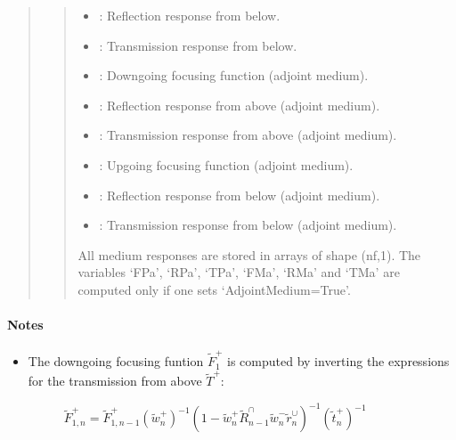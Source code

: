 \documentclass[letterpaper,10pt,english]{sphinxmanual}
\begin{document}
\begin{fulllineitems}
\begin{fulllineitems}
\begin{quote}
\begin{description}
\begin{quote}
\begin{description}
\begin{itemize}
\item {} 
: Reflection response from below.

\item {} 
: Transmission response from below.

\item {} 
: Downgoing focusing function (adjoint medium).

\item {} 
: Reflection response from above (adjoint medium).

\item {} 
: Transmission response from above (adjoint medium).

\item {} 
: Upgoing focusing function (adjoint medium).

\item {} 
: Reflection response from below (adjoint medium).

\item {} 
: Transmission response from below (adjoint medium).

\end{itemize}

\end{description}

All medium responses are stored in arrays of shape (nf,1). The variables ‘FPa’, ‘RPa’, ‘TPa’, ‘FMa’, ‘RMa’ and ‘TMa’ are computed only if one sets ‘AdjointMedium=True’.
\end{quote}

\end{description}\end{quote}
\paragraph{Notes}
\begin{itemize}
\item {} \begin{description}
\item[{The downgoing focusing funtion \(\tilde{F}_1^+\) is computed by inverting the expressions for the transmission from above \(\tilde{T}^+\):}] \leavevmode
\(\tilde{F}_{1,n}^+ = \tilde{F}_{1,n-1}^+ (\tilde{w}_n^+)^{-1} (1 - \tilde{w}_n^+ \tilde{R}_{n-1}^{\cap} \tilde{w}_n^- \tilde{r}_n^{\cup} )^{-1} (\tilde{t}_n^+)^{-1}\)

\end{description}


\end{itemize}
\end{fulllineitems}
\end{fulllineitems}
\end{document}
